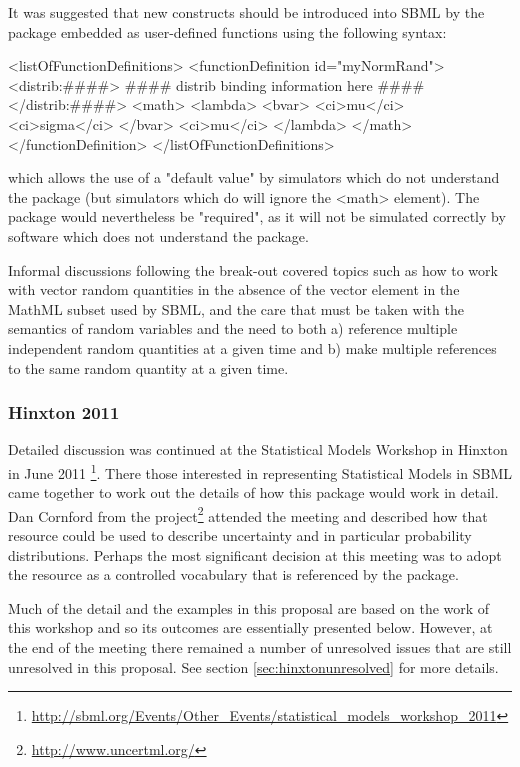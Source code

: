 \documentclass[draftspec]{sbmlpkgspec}
\begin{document}
It was suggested that new constructs should be introduced into SBML by
the package embedded as user-defined functions using the following
syntax:

\begin{example}
<listOfFunctionDefinitions>
  <functionDefinition id="myNormRand">
    <distrib:####>
      #### distrib binding information here ####
    </distrib:####>
    <math>
      <lambda>
        <bvar>
          <ci>mu</ci>
          <ci>sigma</ci>
        </bvar>
        <ci>mu</ci>
      </lambda>
    </math>
  </functionDefinition>
</listOfFunctionDefinitions>
\end{example}

which allows the use of a "default value" by simulators which do not
understand the package (but simulators which do will ignore the <math>
element). The package would nevertheless be "required", as it will not
be simulated correctly by software which does not understand the
package.

Informal discussions following the break-out covered topics such as
how to work with vector random quantities in the absence of the vector
element in the MathML subset used by SBML, and the care that must be
taken with the semantics of random variables and the need to both a)
reference multiple independent random quantities at a given time and
b) make multiple references to the same random quantity at a given
time.

\subsubsection{Hinxton 2011}

Detailed discussion was continued at the Statistical Models Workshop
in Hinxton in June 2011%
\footnote{\url{http://sbml.org/Events/Other_Events/statistical_models_workshop_2011}}. There
those interested in representing Statistical Models in SBML came
together to work out the details of how this package would work in
detail. Dan Cornford from the \uncertml
project\footnote{\url{http://www.uncertml.org/}} attended the meeting
and described how that resource could be used to describe uncertainty
and in particular probability distributions. Perhaps the most
significant decision at this meeting was to adopt the \uncertml
resource as a controlled vocabulary that is referenced by the \distrib package.

Much of the detail and the examples in this proposal are based on
the work of this workshop and so its outcomes are essentially
presented below. However, at the end of the meeting there remained a
number of unresolved issues that are still unresolved in this
proposal. See section \vref{sec:hinxtonunresolved} for more details.
\end{document}
